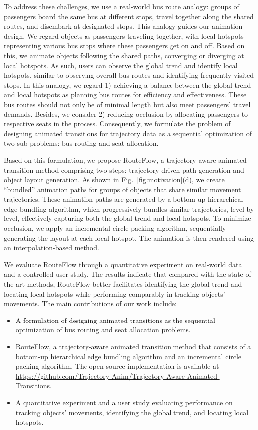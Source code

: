 To address these challenges, we use a real-world bus route analogy: groups of passengers board the same bus at different stops, travel together along the shared routes, and disembark at designated stops.
This analogy guides our animation design.
We regard objects as passengers traveling together, with local hotspots representing various bus stops where these passengers get on and off.
Based on this, we animate objects following the shared paths, converging or diverging at local hotspots. 
As such, users can observe the global trend and identify local hotspots, similar to observing overall bus routes and identifying frequently visited stops.
In this analogy, we regard 1) achieving a balance between the global trend and local hotspots as planning bus routes for efficiency and effectiveness. 
These bus routes should not only be of minimal length but also meet passengers' travel demands.
Besides, we consider 2) reducing occlusion by allocating passengers to respective seats in the process.
Consequently, we formulate the problem of designing animated transitions for trajectory data as a sequential optimization of two sub-problems: bus routing and seat allocation.

Based on this formulation, we propose RouteFlow, a trajectory-aware animated transition method comprising two steps: trajectory-driven path generation and object layout generation. 
As shown in Fig.~\ref{fig:motivation}(d), we create ``bundled'' animation paths for groups of objects that share similar movement trajectories. 
These animation paths are generated by a bottom-up hierarchical edge bundling algorithm, which progressively bundles similar trajectories, level by level, effectively capturing both the global trend and local hotspots. 
To minimize occlusion, we apply an incremental circle packing algorithm, sequentially generating the layout at each local hotspot.
The animation is then rendered using an interpolation-based method.

We evaluate RouteFlow through a quantitative experiment on real-world data and a controlled user study. 
The results indicate that compared with the state-of-the-art methods, RouteFlow better facilitates identifying the global trend and locating local hotspots while performing comparably in tracking objects' movements.
The main contributions of our work include:
\begin{itemize}
[itemsep=2pt,topsep=0pt,parsep=0pt]
    \item A formulation of designing animated transitions as the sequential optimization of bus routing and seat allocation problems.
    \item RouteFlow, a trajectory-aware animated transition method that consists of a bottom-up hierarchical edge bundling algorithm and an incremental circle packing algorithm.
    The open-source implementation is available at \url{https://github.com/Trajectory-Anim/Trajectory-Aware-Animated-Transitions}.
    \item A quantitative experiment and a user study evaluating performance on tracking objects' movements, identifying the global trend, and locating local hotspots.
\end{itemize}

